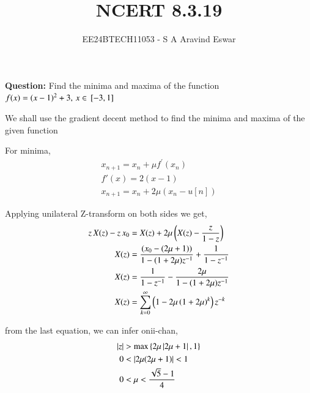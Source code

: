 \documentclass[journal]{IEEEtran}
\begin{document}

\vspace{3cm}

\title{NCERT 8.3.19}
\author{EE24BTECH11053 - S A Aravind Eswar}
{\let\newpage\relax\maketitle}

\renewcommand{\thefigure}{\theenumi}
\renewcommand{\thetable}{\theenumi}
\setlength{\intextsep}{10pt} %

\textbf{Question:} Find the minima and maxima of the function $f(x) = (x-1)^2 + 3,\,x \in {}\left[-3, 1\right]$

We shall use the gradient decent method to find the minima and maxima of the given function

For minima,
\begin{align}
    x_{n+1} = x_n + \mu f^\prime(x_n)\\
    f\prime(x) = 2(x-1)\\
    x_{n+1} = x_n + 2\mu (x_n-u[n])
\end{align}

Applying unilateral Z-transform on both sides we get,
\begin{align}
    z \,X(z) - z\,x_0 &= X(z) + 2\mu\left(X(z) - \frac{z}{1-z}\right)\\
    X(z) &= \frac{(x_0 - (2\mu+1))}{1-(1+2\mu)z^{-1}} + \frac{1}{1-z^{-1}}\\
    X(z) &= \frac{1}{1-z^{-1}} - \frac{2\mu}{1-(1+2\mu)z^{-1}}\\
    X(z) &= \sum_{k=0}^{\infty} \left(1 - 2\mu\left(1+2\mu\right)^k\right)z^{-k}
\end{align}

from the last equation, we can infer onii-chan,
\begin{align}
    \left\vert z\right\vert &> \max{\ensuremath{\left\{2\mu\left\vert2\mu + 1\right\vert,1\right\}}}\\
    0 &< \left\vert2\mu(2\mu + 1)\right\vert < 1\\
    0 &< \mu < \frac{\sqrt{5}-1}{4}
\end{align}
\end{document}
